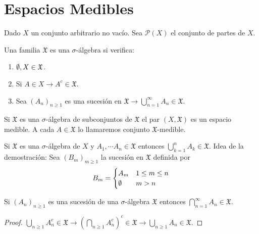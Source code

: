 \section{Espacios Medibles}

Dado $X$ un conjunto arbitrario no vacío. Sea $\mathcal{P}(X)$ el conjunto de partes de $X$.

\begin{definition}
    Una familia $\mathfrak{X}$ es una $\sigma$-álgebra si verifica:
    \begin{enumerate}
        \item $\emptyset, X \in \mathfrak{X}$.
        \item Si $A \in X \to A^c \in \mathfrak{X}$.
        \item Sea $(A_n)_{n \geq 1}$ es una sucesión en $\mathfrak{X} \to \bigcup_{n=1}^{\infty} A_n \in \mathfrak{X}$.
    \end{enumerate}
\end{definition}

Si $\mathfrak{X}$ es una $\sigma$-álgebra de subconjuntos de $\mathfrak{X}$ el par $(X, \mathfrak{X})$ es un espacio medible. A cada $A \in \mathfrak{X}$
lo llamaremos conjunto $\mathfrak{X}$-medible.

\begin{note}
    Si $\mathfrak{X}$ es una $\sigma$-álgebra de $X$ y $A_1, \cdots A_n \in \mathfrak{X}$ entonces $\bigcup_{k=1}^{n} A_k \in \mathfrak{X}$.
    Idea de la demostración: Sea $(B_m)_{m \geq 1}$ la sucesión en $\mathfrak{X}$ definida por \begin{equation}
        B_m = \begin{cases}
            A_m       & 1 \leq m \leq n \\
            \emptyset & m > n
        \end{cases}
    \end{equation}
\end{note}

\begin{note}
    Si $(A_n)_{n \geq 1}$ es una sucesión de una $\sigma$-álgebra $\mathfrak{X}$ entonces $\bigcap_{n=1}^{\infty} A_n \in \mathfrak{X}$.
    \begin{proof}
        $\bigcup_{n \geq 1} A_n^c \in \mathfrak{X} \to (\bigcap_{n \geq 1} A_n^c)^c \in \mathfrak{X} \to \bigcup_{n \geq 1} A_n \in \mathfrak{X}$.
    \end{proof}
\end{note}

